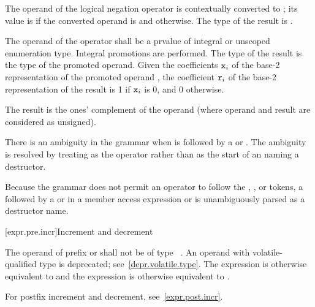\pnum
{}%
The operand of the logical negation operator \tcode{!} is contextually
converted to ;
its value is 
if the converted operand is  and  otherwise.
The type of the result is .

\pnum
{}%
The operand of the \tcode{\~{}} operator shall be a prvalue of
integral or unscoped enumeration type.
Integral promotions are performed.
The type of the result is the type of the promoted operand.
Given the coefficients $\tcode{x}_i$
of the base-2 representation
of the promoted operand ,
the coefficient $\tcode{r}_i$
of the base-2 representation of the result 
is 1 if $\tcode{x}_i$ is 0, and 0 otherwise.
\begin{note}
The result is the ones' complement of the operand
(where operand and result are considered as unsigned).
\end{note}
There is an ambiguity
in the grammar when \tcode{\~{}} is followed by
a  or .
The ambiguity is resolved by treating \tcode{\~{}} as the
operator rather than as the start of an 
naming a destructor.
\begin{note}
Because the grammar does not permit an operator to follow the
, \tcode{->}, or \tcode{::} tokens, a \tcode{\~{}} followed by
a  or  in a
member access expression or  is
unambiguously parsed as a destructor name.
\end{note}

[expr.pre.incr]{Increment and decrement}

\pnum
{}%
%
%
%
%
%
The operand of prefix \tcode{++} or \tcode{--}
shall not be of type \cv{}~.
An operand with volatile-qualified type is deprecated;
see~\ref{depr.volatile.type}.
The expression  is otherwise equivalent to  and
the expression  is otherwise equivalent to .
\begin{note}
For postfix increment and decrement, see~\ref{expr.post.incr}.
\end{note}


